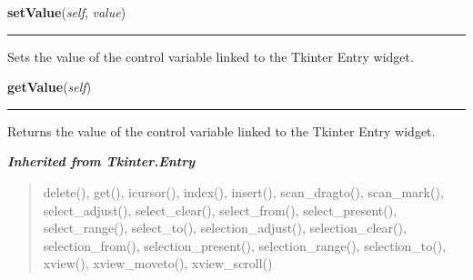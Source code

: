     \label{nMOLDYN:GUI:Widgets:ValidatingEntry:setValue}

    \vspace{0.5ex}

\hspace{.8\funcindent}\begin{boxedminipage}{\funcwidth}

    \raggedright \textbf{setValue}(\textit{self}, \textit{value})

    \vspace{-1.5ex}

    \rule{\textwidth}{0.5\fboxrule}
\setlength{\parskip}{2ex}
    Sets the value of the control variable linked to the Tkinter Entry 
    widget.

\setlength{\parskip}{1ex}
    \end{boxedminipage}

    \label{nMOLDYN:GUI:Widgets:ValidatingEntry:getValue}

    \vspace{0.5ex}

\hspace{.8\funcindent}\begin{boxedminipage}{\funcwidth}

    \raggedright \textbf{getValue}(\textit{self})

    \vspace{-1.5ex}

    \rule{\textwidth}{0.5\fboxrule}
\setlength{\parskip}{2ex}
    Returns the value of the control variable linked to the Tkinter Entry 
    widget.

\setlength{\parskip}{1ex}
    \end{boxedminipage}


\large{\textbf{\textit{Inherited from Tkinter.Entry}}}

\begin{quote}
delete(), get(), icursor(), index(), insert(), scan\_dragto(), scan\_mark(), select\_adjust(), select\_clear(), select\_from(), select\_present(), select\_range(), select\_to(), selection\_adjust(), selection\_clear(), selection\_from(), selection\_present(), selection\_range(), selection\_to(), xview(), xview\_moveto(), xview\_scroll()
\end{quote}

